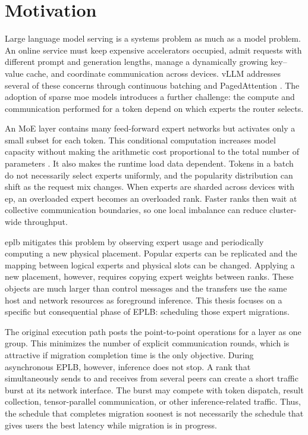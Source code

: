 \section{Motivation}

Large language model serving is a systems problem as much as a model problem.
An online service must keep expensive accelerators occupied, admit requests
with different prompt and generation lengths, manage a dynamically growing
key--value cache, and coordinate communication across devices. vLLM addresses
several of these concerns through continuous batching and PagedAttention
\cite{kwon2023vllm}. The adoption of sparse \gls{moe} models introduces a
further challenge: the compute and communication performed for a token depend
on which experts the router selects.

An MoE layer contains many feed-forward expert networks but activates only a
small subset for each token. This conditional computation increases model
capacity without making the arithmetic cost proportional to the total number
of parameters \cite{shazeer2017moe,fedus2021switch}. It also makes the runtime
load data dependent. Tokens in a batch do not necessarily select experts
uniformly, and the popularity distribution can shift as the request mix
changes. When experts are sharded across devices with \gls{ep}, an overloaded
expert becomes an overloaded rank. Faster ranks then wait at collective
communication boundaries, so one local imbalance can reduce cluster-wide
throughput.

\gls{eplb} mitigates this problem by observing expert usage and periodically
computing a new physical placement. Popular experts can be replicated and the
mapping between logical experts and physical slots can be changed. Applying a
new placement, however, requires copying expert weights between ranks. These
objects are much larger than control messages and the transfers use the same
host and network resources as foreground inference. This thesis focuses on a
specific but consequential phase of EPLB: scheduling those expert migrations.

The original execution path posts the point-to-point operations for a layer as
one group. This minimizes the number of explicit communication rounds, which
is attractive if migration completion time is the only objective. During
asynchronous EPLB, however, inference does not stop. A rank that simultaneously
sends to and receives from several peers can create a short traffic burst at
its network interface. The burst may compete with token dispatch, result
collection, tensor-parallel communication, or other inference-related traffic.
Thus, the schedule that completes migration soonest is not necessarily the
schedule that gives users the best latency while migration is in progress.

